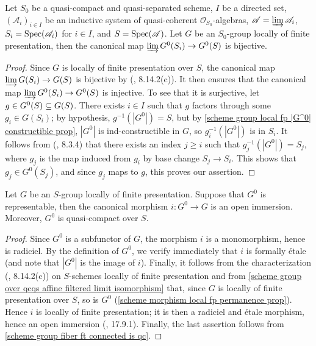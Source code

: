 \begin{corollary}\label{scheme group over qcqs affine filtered limit isomorphism}
Let $S_0$ be a quasi-compact and quasi-separated scheme, $I$ be a directed set, $(\mathscr{A}_i)_{i\in I}$ be an inductive system of quasi-coherent $\mathscr{O}_{S_0}$-algebras, $\mathscr{A}=\varinjlim\mathscr{A}_i$, $S_i=\mathrm{Spec}(\mathscr{A}_i)$ for $i\in I$, and $S=\mathrm{Spec}(\mathscr{A})$. Let $G$ be an $S_0$-group locally of finite presentation, then the canonical map $\varinjlim G^0(S_i)\to G^0(S)$ is bijective.
\end{corollary}
\begin{proof}
Since $G$ is locally of finite presentation over $S$, the canonical map $\varinjlim G(S_i)\to G(S)$ is bijective by (\cite{EGA4-2}, 8.14.2(c)). It then ensures that the canonical map $\varinjlim G^0(S_i)\to G^0(S)$ is injective. To see that it is surjective, let $g\in G^0(S)\subseteq G(S)$. There exists $i\in I$ such that $g$ factors through some $g_i\in G(S_i)$; by hypothesis, $g^{-1}(|G^0|)=S$, but by \cref{scheme group local fp |G^0| constructible prop}, $|G^0|$ is ind-constructible in $G$, so $g_i^{-1}(|G^0|)$ is in $S_i$. It follows from (\cite{EGA4-2}, 8.3.4) that there exists an index $j\geq i$ such that $g_j^{-1}(|G^0|)=S_j$, where $g_j$ is the map induced from $g_i$ by base change $S_j\to S_i$. This shows that $g_j\in G^0(S_j)$, and since $g_j$ maps to $g$, this proves our assertion.
\end{proof}

\begin{proposition}\label{scheme group local fp identity component representable is qc open}
Let $G$ be an $S$-group locally of finite presentation. Suppose that $G^0$ is representable, then the canonical morphism $i:G^0\to G$ is an open immersion. Moreover, $G^0$ is quasi-compact over $S$.
\end{proposition}
\begin{proof}
Since $G^0$ is a subfunctor of $G$, the morphism $i$ is a monomorphism, hence is radiciel. By the definition of $G^0$, we verify immediately that $i$ is formally \'etale (and note that $|G^0|$ is the image of $i$). Finally, it follows from the characterization (\cite{EGA4-3}, 8.14.2(c)) on $S$-schemes locally of finite presentation and from \cref{scheme group over qcqs affine filtered limit isomorphism} that, since $G$ is locally of finite presentation over $S$, so is $G^0$ (\cref{scheme morphism local fp permanence prop}). Hence $i$ is locally of finite presentation; it is then a radiciel and \'etale morphism, hence an open immersion (\cite{EGA4-4}, 17.9.1). Finally, the last assertion follows from \cref{scheme group fiber ft connected is qc}.
\end{proof}

